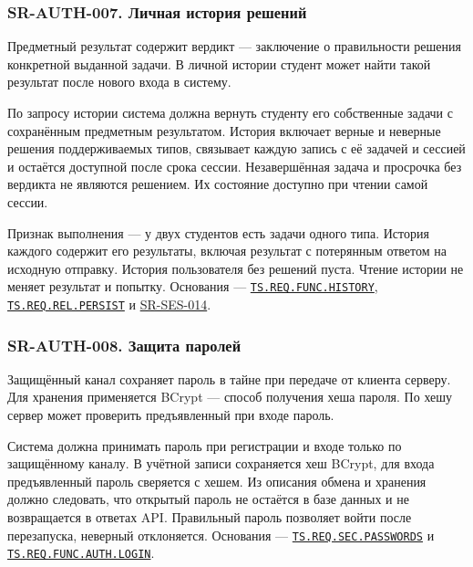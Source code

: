 \documentclass[12pt,a4paper]{article}
\begin{document}
\subsubsection{SR-AUTH-007. Личная история решений}\label{sr-auth-007-ux43bux438ux447ux43dux430ux44f-ux438ux441ux442ux43eux440ux438ux44f-ux440ux435ux448ux435ux43dux438ux439}

\hypertarget{sr-auth-007-личная-история-решений}{}

\hypertarget{sr-auth-007}{}

Предметный результат содержит вердикт --- заключение о правильности решения конкретной выданной задачи. В личной истории студент может найти такой результат после нового входа в систему.

По запросу истории система должна вернуть студенту его собственные задачи с сохранённым предметным результатом. История включает верные и неверные решения поддерживаемых типов, связывает каждую запись с её задачей и сессией и остаётся доступной после срока сессии. Незавершённая задача и просрочка без вердикта не являются решением. Их состояние доступно при чтении самой сессии.

Признак выполнения --- у двух студентов есть задачи одного типа. История каждого содержит его результаты, включая результат с потерянным ответом на исходную отправку. История пользователя без решений пуста. Чтение истории не меняет результат и попытку. Основания --- {\href{../02\_Техническое\_задание/Техническое\_задание.pdf\#ts-req-func-history}{\texttt{TS.\allowbreak{}REQ.\allowbreak{}FUNC.\allowbreak{}HISTORY}}}, {\href{../02\_Техническое\_задание/Техническое\_задание.pdf\#ts-req-rel-persist}{\texttt{TS.\allowbreak{}REQ.\allowbreak{}REL.\allowbreak{}PERSIST}}} и {\hyperlink{sr-ses-014}{SR-SES-014}}.

\subsubsection{SR-AUTH-008. Защита паролей}\label{sr-auth-008-ux437ux430ux449ux438ux442ux430-ux43fux430ux440ux43eux43bux435ux439}

\hypertarget{sr-auth-008-защита-паролей}{}

\hypertarget{sr-auth-008}{}

Защищённый канал сохраняет пароль в тайне при передаче от клиента серверу. Для хранения применяется BCrypt --- способ получения хеша пароля. По хешу сервер может проверить предъявленный при входе пароль.

Система должна принимать пароль при регистрации и входе только по защищённому каналу. В учётной записи сохраняется хеш BCrypt, для входа предъявленный пароль сверяется с хешем. Из описания обмена и хранения должно следовать, что открытый пароль не остаётся в базе данных и не возвращается в ответах API. Правильный пароль позволяет войти после перезапуска, неверный отклоняется. Основания --- {\href{../02\_Техническое\_задание/Техническое\_задание.pdf\#ts-req-sec-passwords}{\texttt{TS.\allowbreak{}REQ.\allowbreak{}SEC.\allowbreak{}PASSWORDS}}} и {\href{../02\_Техническое\_задание/Техническое\_задание.pdf\#ts-req-func-auth-login}{\texttt{TS.\allowbreak{}REQ.\allowbreak{}FUNC.\allowbreak{}AUTH.\allowbreak{}LOGIN}}}.
\end{document}
